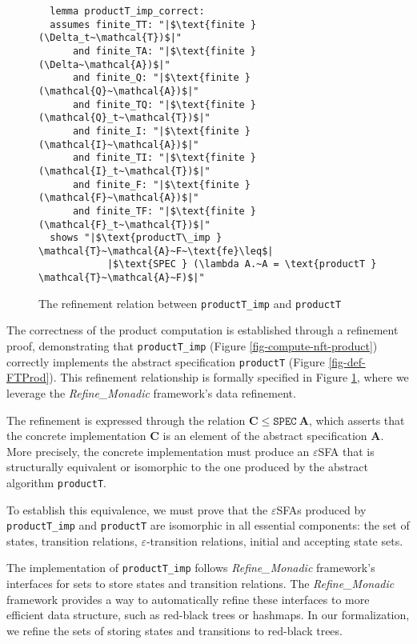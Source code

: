   \begin{figure}[hbt!]
    \begin{lstlisting}
  lemma productT_imp_correct:
  assumes finite_TT: "|$\text{finite } (\Delta_t~\mathcal{T})$|"
      and finite_TA: "|$\text{finite } (\Delta~\mathcal{A})$|"
      and finite_Q: "|$\text{finite } (\mathcal{Q}~\mathcal{A})$|"
      and finite_TQ: "|$\text{finite } (\mathcal{Q}_t~\mathcal{T})$|"
      and finite_I: "|$\text{finite } (\mathcal{I}~\mathcal{A})$|"
      and finite_TI: "|$\text{finite } (\mathcal{I}_t~\mathcal{T})$|"
      and finite_F: "|$\text{finite } (\mathcal{F}~\mathcal{A})$|"
      and finite_TF: "|$\text{finite } (\mathcal{F}_t~\mathcal{T})$|"
  shows "|$\text{productT\_imp } \mathcal{T}~\mathcal{A}~F~\text{fe}\leq$|
            |$\text{SPEC } (\lambda A.~A = \text{productT } \mathcal{T}~\mathcal{A}~F)$|"
  \end{lstlisting}
  \caption{The refinement relation between \texttt{productT\_imp} and \texttt{productT}}
  \label{fig-def-productT_imp_correct}
  \end{figure}

  The correctness of the product computation is established through a refinement proof, demonstrating that \texttt{productT\_imp} (Figure \ref{fig-compute-nft-product}) correctly implements the abstract specification \texttt{productT} (Figure \ref{fig-def-FTProd}). This refinement relationship is formally specified in Figure \ref{fig-def-productT_imp_correct}, where we leverage the \emph{Refine\_Monadic} framework's data refinement.

  The refinement is expressed through the relation $\mathbf{C} \leq \texttt{SPEC}~\mathbf{A}$, which asserts that the concrete implementation $\mathbf{C}$ is an element of the abstract specification $\mathbf{A}$. More precisely,  the concrete implementation must produce an $\varepsilon$SFA that is structurally equivalent or isomorphic to the one produced by the abstract algorithm \texttt{productT}.

  To establish this equivalence, we must prove that the $\varepsilon$SFAs produced by \texttt{productT\_imp} and \texttt{productT} are isomorphic in all essential components: the set of states, transition relations, $\varepsilon$-transition relations, initial and accepting state sets.



The implementation of \texttt{productT\_imp} follows \emph{Refine\_Monadic} framework's interfaces for sets to store states and transition relations. 
The \emph{Refine\_Monadic} framework provides a way to automatically refine these interfaces to more efficient data structure, such as red-black trees or hashmaps. 
In our formalization, we refine the sets of storing states and transitions to red-black trees.

